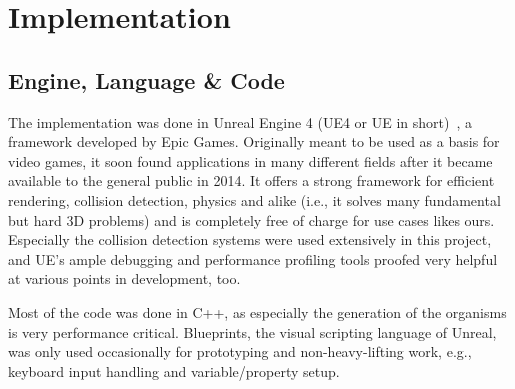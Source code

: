 \documentclass[11pt, abstract=on]{scrartcl}
\begin{document}
\section{Implementation}
\subsection{Engine, Language \& Code}
The implementation was done in Unreal Engine 4 (UE4 or UE in short)~\cite{WhatIsUnreal}, a framework developed by Epic Games. Originally meant to be used as a basis for video games, it soon found applications in many different fields after it became available to the general public in 2014. It offers a strong framework for efficient rendering, collision detection, physics and alike (i.e., it solves many fundamental but hard 3D problems) and is completely free of charge for use cases likes ours. Especially the collision detection systems were used extensively in this project, and UE's ample debugging and performance profiling tools proofed very helpful at various points in development, too. 

Most of the code was done in C++, as especially the generation of the organisms is very performance critical. Blueprints, the visual scripting language of Unreal, was only used occasionally for prototyping and non-heavy-lifting work, e.g., keyboard input handling and variable/property setup.
\end{document}
